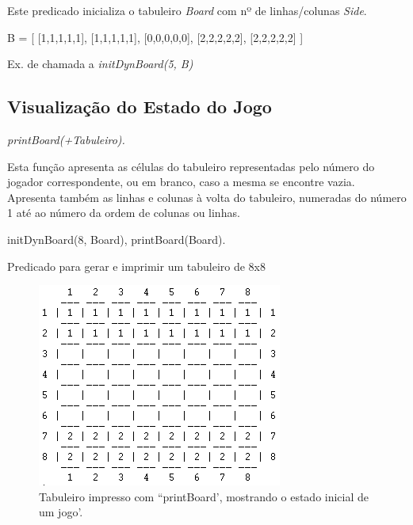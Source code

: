 \documentclass[15pt,a4paper]{article}
\begin{document}
Este predicado inicializa o tabuleiro \textit{Board} com nº de linhas/colunas \textit{Side}.

\begin{code}[H]
	\begin{verbatimtab}
B = [
	[1,1,1,1,1],
	[1,1,1,1,1],
	[0,0,0,0,0],
	[2,2,2,2,2],
	[2,2,2,2,2]
	]
\end{verbatimtab}
\caption{Ex. de chamada a \textit{initDynBoard(5, B)}}
\end{code}


\subsection{Visualização do Estado do Jogo}

\textit{printBoard(+Tabuleiro).}

Esta função apresenta as células do tabuleiro representadas pelo número do jogador correspondente, ou em branco, caso a mesma se encontre vazia.
Apresenta também as linhas e colunas à volta do tabuleiro, numeradas do número 1 até ao número da ordem de colunas ou linhas.
\begin{code}[H]
	\begin{verbatimtab}
initDynBoard(8, Board),
printBoard(Board).
\end{verbatimtab}
\caption{Predicado para gerar e imprimir um tabuleiro de 8x8}
\end{code}

\begin{figure}[h!]
\begin{center}
\includegraphics[scale=1]{fig_tab.png}
\caption{Tabuleiro impresso com ``printBoard', mostrando o estado inicial de um jogo'.}
\label{fig:3}
\end{center}
\end{figure}
\end{document}
